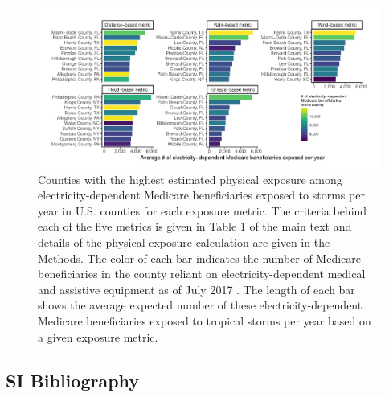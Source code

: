 \documentclass[fleqn,10pt,lineno]{olplainarticle}
\begin{document}
\begin{figure}%
\centering
\includegraphics[width=15.5cm]{figures/topelecdependexposure}
\caption{Counties with the highest estimated physical exposure among electricity-dependent Medicare beneficiaries exposed to storms per year in U.S. counties for each exposure metric. The criteria behind each of the five metrics is given in Table 1 of the main text and details of the physical exposure calculation are given in the Methods. The color of each bar indicates the number of Medicare beneficiaries in the county reliant on electricity-dependent medical and assistive equipment as of July 2017 \cite{empower}. The length of each bar shows the average expected number of these electricity-dependent Medicare beneficiaries exposed to tropical storms per year based on a given exposure metric.}
\label{fig:topelecdependexposure}
\end{figure}

\clearpage

\subsection*{SI Bibliography}


\end{document}
